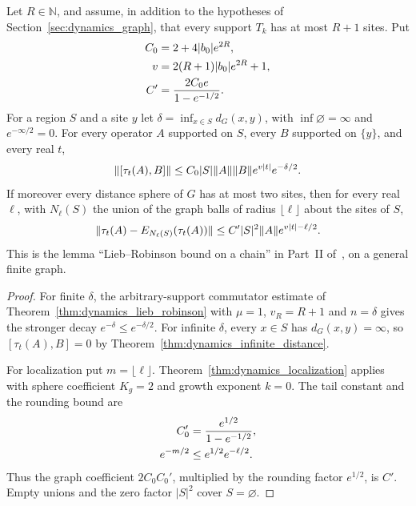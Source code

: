 \begin{lemma}
    \label{thm:dynamics_lieb_robinson_two_spheres}
    \leanok
    Let $R\in\mathbb N$, and assume, in addition to the hypotheses of
    Section~\ref{sec:dynamics_graph}, that every support $T_k$ has at most
    $R+1$ sites. Put
    \begin{align}
        C_0 & =2+4|b_0|e^{2R},\notag           \\
        v   & =2(R+1)|b_0|e^{2R}+1,\notag      \\
        C'  & =\frac{2C_0e}{1-e^{-1/2}}.\notag
    \end{align}
    For a region $S$ and a site $y$ let $\delta=\inf_{x\in S}d_G(x,y)$, with
    $\inf\varnothing=\infty$ and $e^{-\infty/2}=0$. For every operator $A$
    supported on $S$, every $B$ supported on $\{y\}$, and every real $t$,
    \begin{align}
        \|[\tau_t(A),B]\|
        \le C_0|S|\|A\|\|B\|e^{v|t|}e^{-\delta/2}.\notag
    \end{align}
    If moreover every distance sphere of $G$ has at most two sites, then for
    every real $\ell$, with $N_\ell(S)$ the union of the graph balls of radius
    $\lfloor\ell\rfloor$ about the sites of $S$,
    \begin{align}
        \|\tau_t(A)-E_{N_\ell(S)}(\tau_t(A))\|
        \le C'|S|^2\|A\|e^{v|t|-\ell/2}.\notag
    \end{align}
    This is the lemma ``Lieb--Robinson bound on a chain'' in Part~II
    of~\cite{TNLean2026OneDimensional}, on a general finite graph.
\end{lemma}
\begin{proof}
    \leanok
    For finite $\delta$, the arbitrary-support commutator estimate of
    Theorem~\ref{thm:dynamics_lieb_robinson} with $\mu=1$, $v_R=R+1$ and
    $n=\delta$ gives the stronger decay $e^{-\delta}\le e^{-\delta/2}$. For
    infinite $\delta$, every $x\in S$ has $d_G(x,y)=\infty$, so
    $[\tau_t(A),B]=0$ by Theorem~\ref{thm:dynamics_infinite_distance}.

    For localization put $m=\lfloor\ell\rfloor$. Theorem~\ref{thm:dynamics_localization}
    applies with sphere coefficient $K_g=2$ and growth exponent $k=0$. The tail
    constant and the rounding bound are
    \begin{align}
        C_0'     & =\frac{e^{1/2}}{1-e^{-1/2}},\notag \\
        e^{-m/2} & \le e^{1/2}e^{-\ell/2}.\notag
    \end{align}
    Thus the graph coefficient $2C_0C_0'$, multiplied by the rounding factor
    $e^{1/2}$, is $C'$. Empty unions and the zero factor $|S|^2$ cover
    $S=\varnothing$.
\end{proof}

